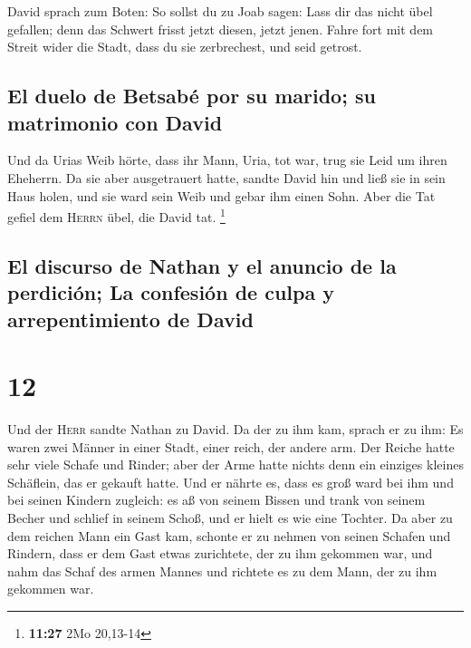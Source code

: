  David sprach zum Boten: So sollst du zu Joab sagen: Lass
dir das nicht übel gefallen; denn das Schwert frisst jetzt diesen, jetzt
jenen. Fahre fort mit dem Streit wider die Stadt, dass du sie
zerbrechest, und seid getrost.

\hypertarget{el-duelo-de-betsabuxe9-por-su-marido-su-matrimonio-con-david}{%
\subsection{El duelo de Betsabé por su marido; su matrimonio con
David}\label{el-duelo-de-betsabuxe9-por-su-marido-su-matrimonio-con-david}}

 Und da Urias Weib hörte, dass ihr Mann, Uria, tot war,
trug sie Leid um ihren Eheherrn.  Da sie aber
ausgetrauert hatte, sandte David hin und ließ sie in sein Haus holen,
und sie ward sein Weib und gebar ihm einen Sohn. Aber die Tat gefiel dem
\textsc{Herrn} übel, die David tat. \footnote{\textbf{11:27} 2Mo
  20,13-14}

\hypertarget{el-discurso-de-nathan-y-el-anuncio-de-la-perdiciuxf3n-la-confesiuxf3n-de-culpa-y-arrepentimiento-de-david}{%
\subsection{El discurso de Nathan y el anuncio de la perdición; La
confesión de culpa y arrepentimiento de
David}\label{el-discurso-de-nathan-y-el-anuncio-de-la-perdiciuxf3n-la-confesiuxf3n-de-culpa-y-arrepentimiento-de-david}}

\hypertarget{section-11}{%
\section{12}\label{section-11}}

 Und der \textsc{Herr} sandte Nathan zu David. Da der zu
ihm kam, sprach er zu ihm: Es waren zwei Männer in einer Stadt, einer
reich, der andere arm.  Der Reiche hatte sehr viele Schafe
und Rinder;  aber der Arme hatte nichts denn ein einziges
kleines Schäflein, das er gekauft hatte. Und er nährte es, dass es groß
ward bei ihm und bei seinen Kindern zugleich: es aß von seinem Bissen
und trank von seinem Becher und schlief in seinem Schoß, und er hielt es
wie eine Tochter.  Da aber zu dem reichen Mann ein Gast
kam, schonte er zu nehmen von seinen Schafen und Rindern, dass er dem
Gast etwas zurichtete, der zu ihm gekommen war, und nahm das Schaf des
armen Mannes und richtete es zu dem Mann, der zu ihm gekommen war.

